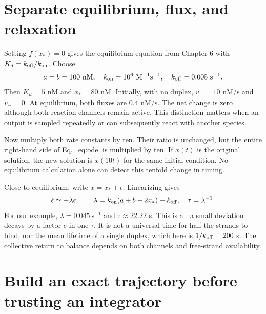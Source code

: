 \section{Separate equilibrium, flux, and relaxation}

Setting $f(x_*)=0$ gives the equilibrium equation from Chapter 6 with
$K_d=k_{\rm off}/k_{\rm on}$. Choose
\begin{equation}
 a=b=100\ {\rm nM},\quad k_{\rm on}=10^6\ {\rm M}^{-1}{\rm s}^{-1},
 \quad k_{\rm off}=0.005\ {\rm s}^{-1}.
\end{equation}
Then $K_d=5$ nM and $x_*=80$ nM. Initially, with no duplex,
$v_+=10$ nM/s and $v_-=0$. At equilibrium, both fluxes are
$0.4$ nM/s. The net change is zero although both reaction channels remain active.
This distinction matters when an output is sampled repeatedly or can
subsequently react with another species.

Now multiply both rate constants by ten. Their ratio is unchanged,
but the entire right-hand side of Eq.~\ref{eq:ode} is multiplied by ten.
If $x(t)$ is the original solution, the new solution is $x(10t)$
for the same initial condition. No equilibrium calculation alone can detect
this tenfold change in timing.


Close to equilibrium, write $x=x_*+\epsilon$. Linearizing gives
\begin{equation}
 \dot\epsilon\simeq-\lambda\epsilon,\qquad
 \lambda=k_{\rm on}(a+b-2x_*)+k_{\rm off},
 \quad \tau=\lambda^{-1}.
\end{equation}
For our example, $\lambda=0.045\ \mathrm{s}^{-1}$ and $\tau\approx22.22$ s.
This is a : a small deviation decays by a factor $e$
in one $\tau$. It is not a universal time for half the strands to bind,
nor the mean lifetime of a single duplex, which here is $1/k_{\rm off}=200$ s.
The collective return to balance depends on both channels and free-strand
availability.

\section{Build an exact trajectory before trusting an integrator}

